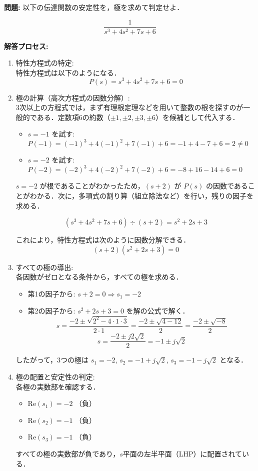 \documentclass[11pt,a4paper]{ltjsarticle}
\begin{document}
\textbf{問題:} 以下の伝達関数の安定性を，極を求めて判定せよ．

$$\frac{1}{s^3+4s^2+7s+6}$$

\textbf{解答プロセス:}

\begin{enumerate}
\item 特性方程式の特定:\\
特性方程式は以下のようになる．
$$P(s)=s^3+4s^2+7s+6=0$$

\item 極の計算（高次方程式の因数分解）:\\
3次以上の方程式では，まず有理根定理などを用いて整数の根を探すのが一般的である．定数項6の約数（$\pm1,\pm2,\pm3,\pm6$）を候補として代入する．
\begin{itemize}
\item $s=-1$ を試す: $P(-1)=(-1)^3+4(-1)^2+7(-1)+6=-1+4-7+6=2\neq0$
\item $s=-2$ を試す: $P(-2)=(-2)^3+4(-2)^2+7(-2)+6=-8+16-14+6=0$
\end{itemize}
$s=-2$ が根であることがわかったため，$(s+2)$ が $P(s)$ の因数であることがわかる．次に，多項式の割り算（組立除法など）を行い，残りの因子を求める．

$$(s^3+4s^2+7s+6)\div(s+2)=s^2+2s+3$$

これにより，特性方程式は次のように因数分解できる．
$$(s+2)(s^2+2s+3)=0$$

\item すべての極の導出:\\
各因数がゼロとなる条件から，すべての極を求める．
\begin{itemize}
\item 第1の因子から: $s+2=0\Rightarrow s_1=-2$
\item 第2の因子から: $s^2+2s+3=0$ を解の公式で解く．
$$s = \frac{-2 \pm \sqrt{2^2 - 4 \cdot 1 \cdot 3}}{2 \cdot 1} = \frac{-2 \pm \sqrt{4 - 12}}{2} = \frac{-2 \pm \sqrt{-8}}{2}$$
$$s = \frac{-2 \pm j2\sqrt{2}}{2} = -1 \pm j\sqrt{2}$$
\end{itemize}

したがって，3つの極は $s_1=-2$, $s_2=-1+j\sqrt{2}$, $s_3=-1-j\sqrt{2}$ となる．

\item 極の配置と安定性の判定:\\
各極の実数部を確認する．
\begin{itemize}
\item $\mathrm{Re}(s_1)=-2$ （負）
\item $\mathrm{Re}(s_2)=-1$ （負）
\item $\mathrm{Re}(s_3)=-1$ （負）
\end{itemize}
すべての極の実数部が負であり，$s$平面の左半平面（LHP）に配置されている．
\end{enumerate}
\end{document}
